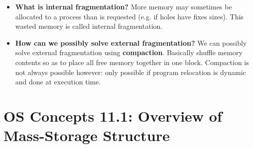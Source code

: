 \documentclass[12pt]{article}
\begin{document}
\begin{itemize}
    \item \textbf{What is internal fragmentation?} More memory may sometimes be allocated to a process than is requested (e.g. if holes have fixes sizes). This wasted memory is called internal fragmentation.
    \item \textbf{How can we possibly solve external fragmentation?} We can possibly solve external fragmentation using \textbf{compaction}. Basically shuffle memory contents so as to place all free memory together in one block. Compaction is not always possible however: only possible if program relocation is dynamic and done at execution time.
\end{itemize}

\section*{OS Concepts 11.1: Overview of Mass-Storage Structure}
\end{document}
